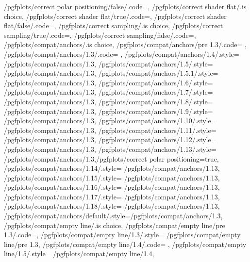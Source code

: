 {	/pgfplots/correct polar positioning/false/.code={\def\b@pgfplots@polaraxis@fix@positioning{0}},
	/pgfplots/correct shader flat/.is choice,
	/pgfplots/correct shader flat/true/.code={\def\b@pgfplots@correct@shader@flat{1}},
	/pgfplots/correct shader flat/false/.code={\def\b@pgfplots@correct@shader@flat{0}},
	/pgfplots/correct sampling/.is choice,
	/pgfplots/correct sampling/true/.code={\let\pgfplotsforeachungroupeduniform@loop@mathengine=\pgfplotsforeachungroupeduniform@loop@mathengine@precise},
	/pgfplots/correct sampling/false/.code={\let\pgfplotsforeachungroupeduniform@loop@mathengine=\pgfplotsforeachungroupeduniform@loop@mathengine@legacy},
	/pgfplots/compat/anchors/.is choice,
	/pgfplots/compat/anchors/pre 1.3/.code={%
		\pgfplots@deprecated@anchorstrue
	},
	/pgfplots/compat/anchors/1.3/.code= {%
		\pgfplots@deprecated@anchorsfalse
	},%
	/pgfplots/compat/anchors/1.4/.style= 	{/pgfplots/compat/anchors/1.3},%
	/pgfplots/compat/anchors/1.5/.style= 	{/pgfplots/compat/anchors/1.3},%
	/pgfplots/compat/anchors/1.5.1/.style= 	{/pgfplots/compat/anchors/1.3},%
	/pgfplots/compat/anchors/1.6/.style= 	{/pgfplots/compat/anchors/1.3},%
	/pgfplots/compat/anchors/1.7/.style= 	{/pgfplots/compat/anchors/1.3},%
	/pgfplots/compat/anchors/1.8/.style= 	{/pgfplots/compat/anchors/1.3},%
	/pgfplots/compat/anchors/1.9/.style= 	{/pgfplots/compat/anchors/1.3},%
	/pgfplots/compat/anchors/1.10/.style= 	{/pgfplots/compat/anchors/1.3},%
	/pgfplots/compat/anchors/1.11/.style= 	{/pgfplots/compat/anchors/1.3},%
	/pgfplots/compat/anchors/1.12/.style= 	{/pgfplots/compat/anchors/1.3},%
	/pgfplots/compat/anchors/1.13/.style= 	{/pgfplots/compat/anchors/1.3,/pgfplots/correct polar positioning=true},%
	/pgfplots/compat/anchors/1.14/.style= 	{/pgfplots/compat/anchors/1.13},%
	/pgfplots/compat/anchors/1.15/.style= 	{/pgfplots/compat/anchors/1.13},%
	/pgfplots/compat/anchors/1.16/.style= 	{/pgfplots/compat/anchors/1.13},%
	/pgfplots/compat/anchors/1.17/.style= 	{/pgfplots/compat/anchors/1.13},%
	/pgfplots/compat/anchors/1.18/.style= 	{/pgfplots/compat/anchors/1.13},%
	/pgfplots/compat/anchors/default/.style={/pgfplots/compat/anchors/1.3},%
	/pgfplots/compat/empty line/.is choice,
	/pgfplots/compat/empty line/pre 1.3/.code={\pgfplots@emptyline@compattrue},%
	/pgfplots/compat/empty line/1.3/.style= {/pgfplots/compat/empty line/pre 1.3},%
	/pgfplots/compat/empty line/1.4/.code= 	{\pgfplots@emptyline@compatfalse},%
	/pgfplots/compat/empty line/1.5/.style= 	{/pgfplots/compat/empty line/1.4},%
}
